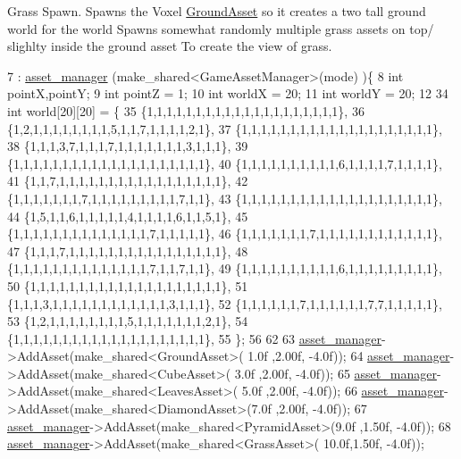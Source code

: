 Grass Spawn. Spawns the Voxel \hyperlink{classGroundAsset}{Ground\+Asset} so it creates a two tall ground world for the world Spawns somewhat randomly multiple grass assets on top/ slighlty inside the ground asset To create the view of grass.
\begin{DoxyCode}
7                                           : \hyperlink{classGameWorld_aec5c0bca4fb5a41e4aac2dce2871266d}{asset\_manager} (make\_shared<GameAssetManager>(mode)
      )\{
8   \textcolor{keywordtype}{int} pointX,pointY;
9   \textcolor{keywordtype}{int} pointZ = 1;
10   \textcolor{keywordtype}{int} worldX = 20;
11   \textcolor{keywordtype}{int} worldY = 20;
12 
34   \textcolor{keywordtype}{int} world[20][20] = \{
35   \{1,1,1,1,1,1,1,1,1,1,1,1,1,1,1,1,1,1,1,1\},
36   \{1,2,1,1,1,1,1,1,1,1,5,1,1,7,1,1,1,1,2,1\},
37   \{1,1,1,1,1,1,1,1,1,1,1,1,1,1,1,1,1,1,1,1\},
38   \{1,1,1,3,7,1,1,1,7,1,1,1,1,1,1,1,3,1,1,1\},
39   \{1,1,1,1,1,1,1,1,1,1,1,1,1,1,1,1,1,1,1,1\},
40   \{1,1,1,1,1,1,1,1,1,1,6,1,1,1,1,7,1,1,1,1\},
41   \{1,1,7,1,1,1,1,1,1,1,1,1,1,1,1,1,1,1,1,1\},
42   \{1,1,1,1,1,1,1,7,1,1,1,1,1,1,1,1,1,7,1,1\},
43   \{1,1,1,1,1,1,1,1,1,1,1,1,1,1,1,1,1,1,1,1\},
44   \{1,5,1,1,6,1,1,1,1,1,4,1,1,1,1,6,1,1,5,1\},
45   \{1,1,1,1,1,1,1,1,1,1,1,1,1,1,7,1,1,1,1,1\},
46   \{1,1,1,1,1,1,1,7,1,1,1,1,1,1,1,1,1,1,1,1\},
47   \{1,1,1,7,1,1,1,1,1,1,1,1,1,1,1,1,1,1,1,1\},
48   \{1,1,1,1,1,1,1,1,1,1,1,1,1,1,7,1,1,7,1,1\},
49   \{1,1,1,1,1,1,1,1,1,1,6,1,1,1,1,1,1,1,1,1\},
50   \{1,1,1,1,1,1,1,1,1,1,1,1,1,1,1,1,1,1,1,1\},
51   \{1,1,1,3,1,1,1,1,1,1,1,1,1,1,1,1,3,1,1,1\},
52   \{1,1,1,1,1,1,7,1,1,1,1,1,1,7,7,1,1,1,1,1\},
53   \{1,2,1,1,1,1,1,1,1,1,5,1,1,1,1,1,1,1,2,1\},
54   \{1,1,1,1,1,1,1,1,1,1,1,1,1,1,1,1,1,1,1,1\},
55   \};
56   
62 
63         \hyperlink{classGameWorld_aec5c0bca4fb5a41e4aac2dce2871266d}{asset\_manager}->AddAsset(make\_shared<GroundAsset>( 1.0f ,2.00f, -4.0f));
64         \hyperlink{classGameWorld_aec5c0bca4fb5a41e4aac2dce2871266d}{asset\_manager}->AddAsset(make\_shared<CubeAsset>(   3.0f ,2.00f, -4.0f));
65         \hyperlink{classGameWorld_aec5c0bca4fb5a41e4aac2dce2871266d}{asset\_manager}->AddAsset(make\_shared<LeavesAsset>( 5.0f ,2.00f, -4.0f));
66         \hyperlink{classGameWorld_aec5c0bca4fb5a41e4aac2dce2871266d}{asset\_manager}->AddAsset(make\_shared<DiamondAsset>(7.0f ,2.00f, -4.0f));
67         \hyperlink{classGameWorld_aec5c0bca4fb5a41e4aac2dce2871266d}{asset\_manager}->AddAsset(make\_shared<PyramidAsset>(9.0f ,1.50f, -4.0f)); 
68         \hyperlink{classGameWorld_aec5c0bca4fb5a41e4aac2dce2871266d}{asset\_manager}->AddAsset(make\_shared<GrassAsset>(  10.0f,1.50f, -4.0f));

\end{DoxyCode}
